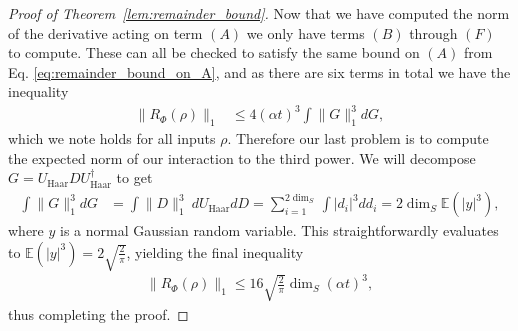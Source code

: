 \documentclass{article}
\newcommand{\matt}[1]{\todo[color=red!50, prepend, caption={Matt}, tickmarkheight=0.25cm]{#1}}
\newcommand{\abs}[1]{\left| #1 \right|}
\newcommand{\norm}[1]{\| #1 \|}
\begin{document}
\begin{proof}[Proof of Theorem~\ref{lem:remainder_bound}]
Now that we have computed the norm of the derivative acting on term $(A)$ we only have terms $(B)$ through $(F)$ to compute. These can all be checked to satisfy the same bound on $(A)$ from Eq. \eqref{eq:remainder_bound_on_A}, and as there are six terms in total we have the inequality
\begin{align}
    \norm{R_{\Phi}(\rho)}_1 &\le 4 (\alpha t)^3 \int \norm{G}_1^3 dG,
\end{align}
which we note holds for all inputs $\rho$. Therefore our last problem is to compute the expected norm of our interaction to the third power. We will decompose $G = U_{\text{Haar}} D U_{\text{Haar}}^\dagger $ to get
\begin{align}
    \int \norm{G}_1^3 dG &= \int \norm{D}_1^3 ~ dU_{\text{Haar}} dD = \sum_{i = 1}^{2 \dim_S} \int \abs{d_i}^3 dd_i = 2 \dim_S \mathbb{E}(\abs{y}^3),
\end{align}
where $y$ is a normal Gaussian random variable. This straightforwardly evaluates to $\mathbb{E}( |y|^3) = 2\sqrt{ \frac{2}{\pi}}$, yielding the final inequality
\begin{align}
    \norm{R_{\Phi}(\rho)}_1 \le 16 \sqrt{\frac{2}{\pi}} \dim_S (\alpha t)^3 ,
\end{align}
thus completing the proof.
\end{proof}
\end{document}
